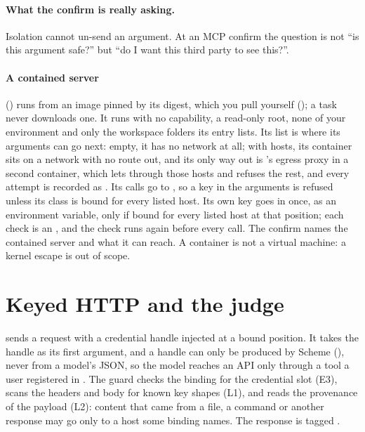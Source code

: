\paragraph{What the confirm is really asking.} Isolation cannot un-send an
argument. At an MCP confirm the question is not ``is this argument safe?''
but ``do I want this third party to see this?''.

\paragraph{A contained server} () runs from
an image pinned by its digest, which you pull yourself
(); a task never downloads one. It runs with no
capability, a read-only root, none of your environment and only the
workspace folders its entry lists. Its  list is where its
arguments can go next: empty, it has no network at all; with hosts, its
container sits on a network with no route out, and its only way out is
\nodwyn{}'s egress proxy in a second container, which lets through those
hosts and refuses the rest, and every attempt is recorded as
. Its calls go to , so a key in the
arguments is refused unless its class is bound for every listed host. Its
own key goes in once, as an environment variable, only if bound for every
listed host at that  position; each check is an
, and the check runs again before every call. The
confirm names the contained server and what it can reach. A container is
not a virtual machine: a kernel escape is out of scope.

\section{Keyed HTTP and the judge}

 sends a request with a credential handle injected at a
bound position. It takes the handle as its first argument, and a handle can
only be produced by Scheme (), never from a
model's JSON, so the model reaches an API only through a tool a user
registered in . The guard checks the binding for the
credential slot (E3), scans the headers and body for known key shapes (L1),
and reads the provenance of the payload (L2): content that came from a file,
a command or another response may go only to a host some binding names.
The response is tagged .

